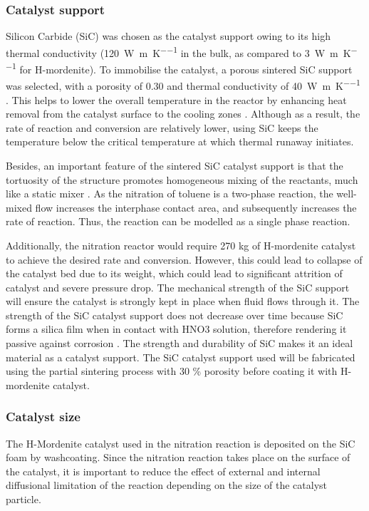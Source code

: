 \subsubsection{Catalyst support}
Silicon Carbide (SiC) was chosen as the catalyst support owing to its high thermal conductivity (\SI{120}{\W\per\m\per\K} in the bulk, as compared to \SI{3}{\W\per\m\per\K} for H-mordenite). To immobilise the catalyst, a porous sintered SiC support was selected, with a porosity of 0.30 and thermal conductivity of \SI{40}{\W\per\m\per\K} \cite{jang_thermophysical_2007}. This helps to lower the overall temperature in the reactor by enhancing heat removal from the catalyst surface to the cooling zones \cite{ledoux_silicon_2001}. Although as a result, the rate of reaction and conversion are relatively lower, using SiC keeps the temperature below the critical temperature at which thermal runaway initiates.

Besides, an important feature of the sintered SiC catalyst support is that the tortuosity of the structure promotes homogeneous mixing of the reactants, much like a static mixer \cite{duong-viet_silicon_2016}. As the nitration of toluene is a two-phase reaction, the well-mixed flow increases the interphase contact area, and subsequently increases the rate of reaction. Thus, the reaction can be modelled as a single phase reaction.

Additionally, the nitration reactor would require 270 kg of H-mordenite catalyst to achieve the desired rate and conversion. However, this could lead to collapse of the catalyst bed due to its weight, which could lead to significant attrition of catalyst and severe pressure drop. The mechanical strength of the SiC support will ensure the catalyst is strongly kept in place when fluid flows through it. The strength of the SiC catalyst support does not decrease over time because SiC forms a silica film when in contact with HNO3 solution, therefore rendering it passive against corrosion \cite{cook_corrosion_2013}. The strength and durability of SiC makes it an ideal material as a catalyst support. The SiC catalyst support used will be fabricated using the partial sintering process with 30 \% porosity before coating it with H-mordenite catalyst.

\subsubsection{Catalyst size}
The H-Mordenite catalyst used in the nitration reaction is deposited on the SiC foam by washcoating. Since the nitration reaction takes place on the surface of the catalyst, it is important to reduce the effect of external and internal diffusional limitation of the reaction depending on the size of the catalyst particle.  

